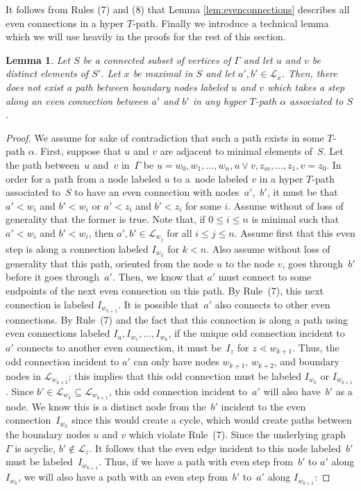 \documentclass[10pt,a4paper]{amsart}
\numberwithin{equation}{section}
\newtheorem{Lemma}[Theorem]{Lemma}
\begin{document}
It follows from Rules (7) and (8) that Lemma \ref{lem:evenconnections} describes all even connections in a hyper $T$-path.
Finally we introduce a technical lemma which we will use heavily in the proofs for the rest of this section.
\begin{Lemma}\label{lem:NoExtendedVertexEvenStep}
Let $S$ be a connected subset of vertices of $\Gamma$ and let $u$ and $v$ be distinct elements of $S'$. Let $x$ be maximal in $S$ and let $a', b' \in \mathcal{L}_x$. Then, there does not exist a path between boundary nodes labeled $u$ and $v$ which takes a step along an even connection between $a'$ and $b'$ in any hyper $T$-path $\alpha$ associated to $S$.
\end{Lemma}
\begin{proof}
We assume for sake of contradiction that such a path exists in some $T$-path $\alpha$. First, suppose that $u$ and $v$ are adjacent to minimal elements of~$S$. Let the path between~$u$ and~$v$ in~$\Gamma$ be $u = w_0, w_1,\ldots,w_n,u \vee v, z_m,\ldots,z_1,v = z_0$. In order for a path from a node labeled $u$ to a~node labeled $v$ in a hyper $T$-path associated to~$S$ to have an even connection with nodes~$a'$,~$b'$, it must be that $a' < w_i$ and $b' < w_i$ or $a' < z_i$ and $b' < z_i$ for some $i$. Assume without of loss of generality that the former is true. Note that, if $0 \leq i \leq n$ is minimal such that $a' < w_i$ and $b' < w_i$, then $a',b' \in \mathcal{L}_{w_j}$ for all $i \leq j \leq n$.
Assume first that this even step is along a connection labeled $I_{w_k}$ for $k < n$. Also assume without loss of generality that this path, oriented from the node $u$ to the node $v$, goes through~$b'$ before it goes through~$a'$. Then, we know that $a'$ must connect to some endpoints of the next even connection on this path. By Rule~(7), this next connection is labeled $I_{w_{k+1}}$. It is possible that~$a'$ also connects to other even connections. By Rule~(7) and the fact that this connection is along a path using even connections labeled $I_u, I_{w_1},\ldots,I_{w_k}$, if the unique odd connection incident to~$a'$ connects to another even connection, it must be~$I_z$ for $z \lessdot w_{k+1}$. Thus, the odd connection incident to $a'$ can only have nodes $w_{k+1}$, $w_{k+2}$, and boundary nodes in $\mathcal{L}_{w_{k+2}}$; this implies that this odd connection must be labeled $I_{w_k}$ or $I_{w_{k+1}}$. Since $b' \in \mathcal{L}_{w_k} \subseteq \mathcal{L}_{w_{k+1}}$, this odd connection incident to~$a'$ will also have~$b'$ as a node. We know this is a distinct node from the~$b'$ incident to the even connection~$I_{w_k}$ since this would create a cycle, which would create paths between the boundary nodes $u$ and $v$ which violate Rule~(7). Since the underlying graph~$\Gamma$ is acyclic, $b' \notin \mathcal{L}_{z}$. It follows that the even edge incident to this node labeled~$b'$ must be labeled~$I_{w_{k+1}}$. Thus, if we have a path with even step from~$b'$ to $a'$ along $I_{w_k}$, we will also have a path with an even step from~$b'$ to~$a'$ along $I_{w_{k+1}}$:

\end{proof}
\end{document}
